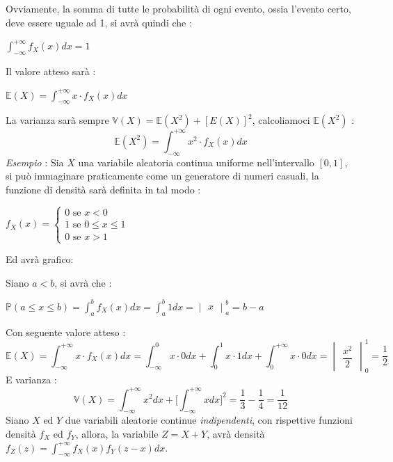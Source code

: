 \documentclass[12pt, letterpaper]{article}
\newcommand{\E}{{\mathbb E}}
\newcommand{\V}{{\mathbb V}}
\newcommand{\acc}{\\\hphantom{}\\}
\newcommand{\Prob}{{\mathbb P}}
\begin{document}
Ovviamente, la somma di tutte le probabilità di ogni evento, ossia l'evento certo, deve essere uguale 
ad 1, si avrà quindi che :\begin{center}
    \(\displaystyle\int_{-\infty}^{+\infty}f_X(x)dx=1\)
\end{center}
Il valore atteso sarà : \begin{center}
    \(\E(X)=\displaystyle\int_{-\infty}^{+\infty}x\cdot f_X(x)dx\)
\end{center}
La varianza sarà sempre \(\V(X)=\E(X^2)+[E(X)]^2\), calcoliamoci \(\E(X^2)\) : \begin{equation}
    \E(X^2)=\displaystyle\int_{-\infty}^{+\infty}x^2\cdot f_X(x)dx
\end{equation}
\textit{Esempio} : Sia \(X\) una variabile aleatoria continua uniforme nell'intervallo \([0,1]\), si può 
immaginare praticamente come un generatore di numeri casuali, la funzione di densità sarà 
definita in tal modo : \begin{center}
    \(f_X(x)=\begin{cases}
        0 \text{ se }x<0\\
        1 \text{ se }0\le x\le 1\\
        0 \text{ se }x>1
        \end{cases}\)
\end{center}
Ed avrà grafico:\\
\begin{figure}[h]
\end{figure}

Siano \(a<b\), si avrà che : \begin{center}
    \(\Prob(a\le x\le b)=\displaystyle\int_a^bf_X(x)dx=\displaystyle\int_a^b1dx=\begin{vmatrix}
        x
    \end{vmatrix}_a^b=b-a\)
\end{center}
Con seguente valore atteso : \begin{equation}
    \E(X)=\displaystyle\int_{-\infty}^{+\infty}x\cdot f_X(x)dx=
    \displaystyle\int_{-\infty}^{0}x\cdot 0dx+
    \displaystyle\int_{0}^{1}x\cdot 1dx+
    \displaystyle\int_{0}^{+\infty}x\cdot 0dx=\begin{vmatrix}
        \dfrac{x^2}{2}
    \end{vmatrix}_0^1=\dfrac{1}{2}
\end{equation}
E varianza : \begin{equation}
    \V(X)=\int_{-\infty}^{+\infty}x^2dx+\Big[ \int_{-\infty}^{+\infty}xdx \Big]^2=\dfrac{1}{3}-\dfrac{1}{4}=\dfrac{1}{12}
\end{equation}
Siano \(X\) ed \(Y\) due variabili aleatorie continue \textit{indipendenti}, con rispettive 
funzioni densità \(f_X\) ed \(f_Y\), allora, la variabile \(Z=X+Y\), avrà densità \(f_Z(z)=
\displaystyle\int_{-\infty}^{+\infty}f_X(x)f_Y(z-x)dx\).\acc 
\end{document}
